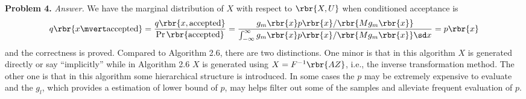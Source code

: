 \documentclass[english, nochinese]{pnote}
\DeclareMathOperator\oppr{\mathrm{Pr}}
\begin{document}
\textbf{Problem 4.} \textit{Answer.} We have the marginal distribution of $X$ with respect to $ \rbr{ X, U } $ when conditioned acceptance is
\begin{equation}
q \rbr{ x \mvert \text{accepted} } = \frac{ q \rbr{ x, \text{accepted} } }{ \oppr \rbr{\text{accepted}} } = \frac{ g_m \rbr{x} p \rbr{x} / \rbr{ M g_m \rbr{x} } }{ \int_{-\infty}^\infty g_m \rbr{x} p \rbr{x} / \rbr{ M g_m \rbr{x} } \sd x } = p \rbr{x}
\end{equation}
and the correctness is proved. Compared to Algorithm 2.6, there are two distinctions. One minor is that in this algorithm $X$ is generated directly or say ``implicitly'' while in Algorithm 2.6 $X$ is generated using $ X = F^{-1} \rbr{ A Z } $, i.e., the inverse transformation method. The other one is that in this algorithm some hierarchical structure is introduced. In some cases the $p$ may be extremely expensive to evaluate and the $g_l$, which provides a estimation of lower bound of $p$, may helps filter out some of the samples and alleviate frequent evaluation of $p$.
\end{document}
